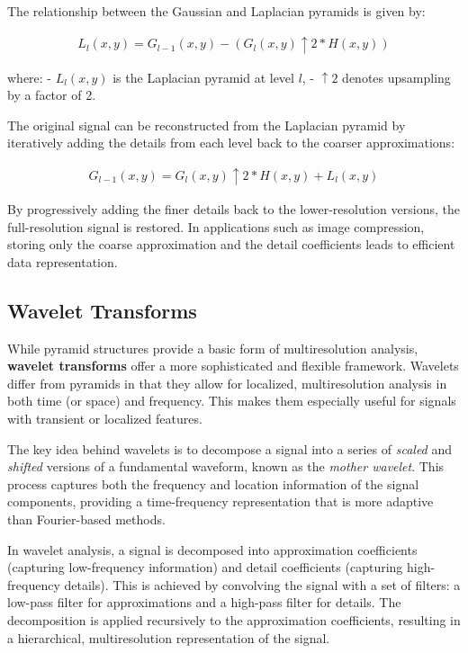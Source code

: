 The relationship between the Gaussian and Laplacian pyramids is given by:

\begin{align}
  L_l(x, y) = G_{l-1}(x, y) - (G_l(x, y) \uparrow 2 * H(x, y))
\end{align}

where:
- \( L_l(x, y) \) is the Laplacian pyramid at level \( l \),
- \( \uparrow 2 \) denotes upsampling by a factor of 2.

The original signal can be reconstructed from the Laplacian pyramid by iteratively adding the details from each level back to the coarser approximations:

\begin{align}
  G_{l-1}(x, y) = G_l(x, y) \uparrow 2 * H(x, y) + L_l(x, y)  
\end{align}

By progressively adding the finer details back to the lower-resolution versions, the full-resolution signal is restored. In applications such as image compression, storing only the coarse approximation and the detail coefficients leads to efficient data representation.

\subsection{Wavelet Transforms}

While pyramid structures provide a basic form of multiresolution analysis, \textbf{wavelet transforms} offer a more sophisticated and flexible framework. Wavelets differ from pyramids in that they allow for localized, multiresolution analysis in both time (or space) and frequency. This makes them especially useful for signals with transient or localized features.

The key idea behind wavelets is to decompose a signal into a series of \textit{scaled} and \textit{shifted} versions of a fundamental waveform, known as the \textit{mother wavelet}. This process captures both the frequency and location information of the signal components, providing a time-frequency representation that is more adaptive than Fourier-based methods.

In wavelet analysis, a signal is decomposed into approximation coefficients (capturing low-frequency information) and detail coefficients (capturing high-frequency details). This is achieved by convolving the signal with a set of filters: a low-pass filter for approximations and a high-pass filter for details. The decomposition is applied recursively to the approximation coefficients, resulting in a hierarchical, multiresolution representation of the signal.

